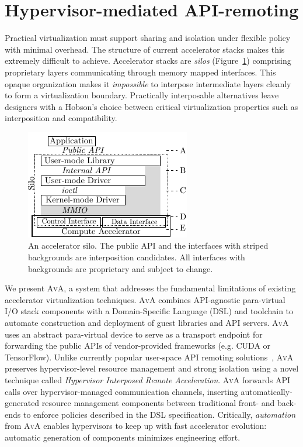 \section{Hypervisor-mediated API-remoting}
\label{sec:ava}

Practical virtualization must support sharing and isolation under flexible
policy with minimal overhead. The structure of current accelerator stacks
makes this extremely difficult to achieve.
Accelerator stacks are \emph{silos} (Figure~\ref{fig:silo})
comprising proprietary layers communicating through memory mapped interfaces.
This opaque organization makes it \emph{impossible} to interpose intermediate
layers cleanly to form a virtualization boundary. Practically interposable
alternatives leave designers with a Hobson's choice between critical
virtualization properties such as interposition and compatibility.

\begin{figure}[!ht]
	\centering
	\includegraphics[width=.4\linewidth]{figures/silo.pdf}
	\caption{An accelerator silo.
		The public API and the interfaces with striped backgrounds are interposition candidates.
		All interfaces with backgrounds are proprietary and subject to change.
        }
	\label{fig:silo}
\end{figure}

We present \textsc{AvA}, a system that addresses the fundamental limitations
of existing accelerator virtualization techniques.
\textsc{AvA} combines API-agnostic para-virtual I/O stack components with a
Domain-Specific Language (DSL) and toolchain to automate construction
and deployment of guest libraries and API servers.
\textsc{AvA} uses an abstract para-virtual device to serve as a transport
endpoint for forwarding the public APIs of vendor-provided frameworks (e.g.
CUDA or TensorFlow). Unlike currently popular user-space API remoting
solutions~\cite{bitfusion,xaas,vmCUDA,rCUDA,cu2rcu}, \textsc{AvA} preserves
hypervisor-level resource management and strong isolation using a novel
technique called \emph{{{H}ypervisor {I}nterposed {R}emote {A}cceleration}}.
\textsc{AvA} forwards API calls over hypervisor-managed communication channels,
inserting automatically-generated resource management components between
traditional front- and back-ends
to enforce policies described in the DSL specification.
Critically, \emph{automation} from \textsc{AvA} enables hypervisors to keep up
with fast accelerator evolution: automatic generation of components minimizes
engineering effort.

